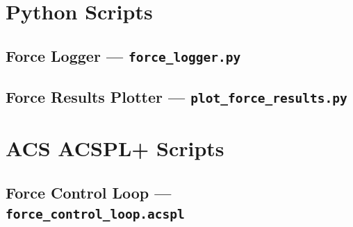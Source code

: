 
\section{Python Scripts}
\label{app:code-python}


\subsection{Force Logger — \texttt{force\_logger.py}}
\label{app:code:logger}

\begin{pythoncode}

\end{pythoncode}


\subsection{Force Results Plotter — \texttt{plot\_force\_results.py}}
\label{app:code:plotter}

\begin{pythoncode}

\end{pythoncode}


\section{ACS ACSPL+ Scripts}
\label{app:code-acs}

\subsection{Force Control Loop — \texttt{force\_control\_loop.acspl}}
\label{app:code:acspl}

